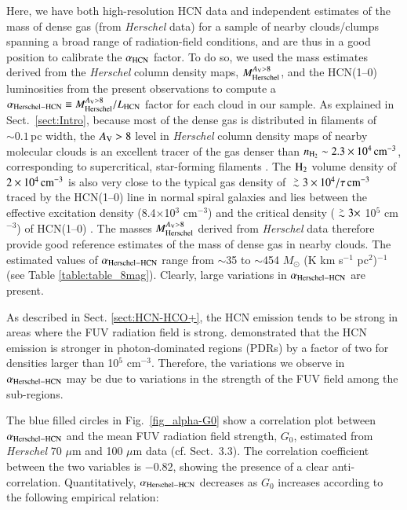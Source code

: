\documentclass{aa}
\def\gtsima{$\; \buildrel > \over \sim \;$}
\def\simgt{\lower.5ex\hbox{\gtsima}}
\begin{document}
{Here, we have both high-resolution HCN data and independent estimates of the mass of dense gas (from {\it Herschel} data) 
for a sample of nearby clouds/clumps spanning a broad range of radiation-field conditions, and are thus in a good position 
to calibrate the $\alpha_{\rm HCN}$ factor. 
To do so, we used the mass estimates derived from the {\it Herschel} column density maps,  $M_{\rm Herschel}^{A_{\rm V}>8}$,  
and the HCN(1--0) luminosities from the present observations to compute a 
$\alpha_{\rm Herschel-HCN} \equiv M_{\rm Herschel}^{A_{\rm V}>8}/L_{\rm HCN}$ factor for each cloud in our sample. 
As explained in Sect.~\ref{sect:Intro}, because most of the dense gas is distributed in filaments of $\sim 0.1\,$pc width, 
the $A_{\rm V} > 8$ level in {\it Herschel} column density maps of nearby molecular clouds is an excellent tracer of the 
gas denser than $n_{\rm H_2} \sim 2.3 \times10^4\, \rm{cm}^{-3}$, corresponding to supercritical, star-forming filaments \citep[cf.][]{Andre14}.  
The ${\rm H_2}$ volume density of $2 \times10^4\, \rm{cm}^{-3}$ is also very close to the typical gas density of $\simgt 3 \times 10^4 /\tau \, \rm{cm}^{-3} $ 
traced by the HCN(1--0) line in normal spiral galaxies \citep[][where $\tau \simgt 1$ is the optical depth of the line]{Gao04b} 
and lies between the effective excitation density (8.4$\times$10$^{3}$ cm$^{-3}$) and the critical density ($\simgt 3 \times$ 10$^{5}$ cm$^{-3}$) 
of HCN(1--0) \citep{Shirley15}. 
The masses $M_{\rm Herschel}^{A_{\rm V}>8}$ derived from {\it Herschel} data therefore provide good reference estimates 
of the mass of dense gas in nearby clouds. 
The estimated values of $\alpha_{\rm Herschel-HCN}$ 
range from $\sim$35 to $\sim$454 $M_{\odot}$ (K km s$^{-1}$ pc$^2$)$^{-1}$ 
(see Table \ref{table:table_8mag}). Clearly, large variations in $\alpha_{\rm Herschel-HCN}$ are present. 


As described in Sect. \ref{sect:HCN-HCO+}, 
the HCN emission tends to be strong 
in areas where the FUV radiation field is strong. 
\citet{Meijerink07} demonstrated that the HCN 
emission is stronger in photon-dominated regions (PDRs) 
by a factor of two for densities larger than 10$^5$ cm$^{-3}$. Therefore, the variations we observe in $\alpha_{\rm Herschel-HCN}$ 
may be due to variations in the strength of the FUV field among the sub-regions.

The blue filled circles in 
Fig.~\ref{fig_alpha-G0} show a correlation plot between $\alpha_{\rm Herschel-HCN}$ and 
the mean FUV radiation field strength, $G_0$, 
estimated from {\it Herschel} 70 $\mu$m and 100 $\mu$m data (cf. Sect.~3.3). 
The correlation coefficient between the two variables is $-0.82$, showing the presence of a clear anti-correlation. 
Quantitatively, $\alpha_{\rm Herschel-HCN}$ decreases as $G_0$ increases according to the following empirical relation: 

}
\end{document}
